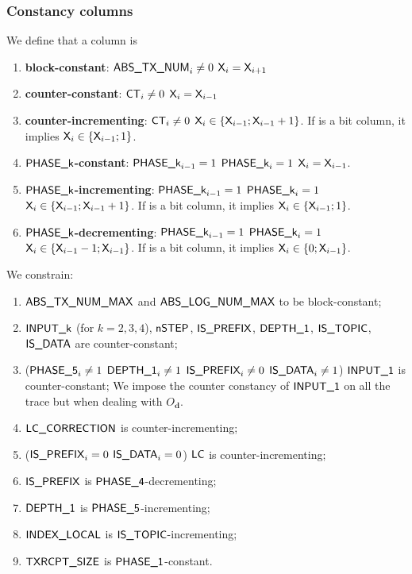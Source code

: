 \subsubsection{Constancy columns} \label{constancy_constraints}
We define that a column  is
\begin{enumerate}
    \item \textbf{block-constant}: \If $\textsf{ABS\_TX\_NUM}_{i} \ne 0$ \Then $\textsf{X}_{i}=\textsf{X}_{i+1}$
    \item \textbf{counter-constant}: \If $\textsf{CT}_{i} \ne 0$ \Then $\textsf{X}_{i}=\textsf{X}_{i-1}$
    \item \textbf{counter-incrementing}: \If $\textsf{CT}_{i} \ne 0$ \Then $\textsf{X}_{i} \in \{\textsf{X}_{i-1}; \textsf{X}_{i-1} +1 \}$. If  is a bit column, it implies $\textsf{X}_{i} \in \{\textsf{X}_{i-1}; 1 \}$.
    \item \textbf{$\bm{\textsf{PHASE\_k}}$-constant}: \If $\textsf{PHASE\_k}_{i-1} = 1$ \et $\textsf{PHASE\_k}_{i}=1$ \Then $\textsf{X}_{i}=\textsf{X}_{i-1}$.
    \item \textbf{$\textsf{PHASE\_k}$-incrementing}: \If $\textsf{PHASE\_k}_{i-1} = 1$ \et $\textsf{PHASE\_k}_{i}=1$ \Then $\textsf{X}_{i} \in \{\textsf{X}_{i-1}; \textsf{X}_{i-1} +1 \}$. If  is a bit column, it implies $\textsf{X}_{i} \in \{\textsf{X}_{i-1}; 1 \}$.
    \item \textbf{$\bm{\textsf{PHASE\_k}}$-decrementing}: \If $\textsf{PHASE\_k}_{i-1} = 1$ \et $\textsf{PHASE\_k}_{i}=1$ \Then $\textsf{X}_{i} \in \{\textsf{X}_{i-1} -1; \textsf{X}_{i-1} \}$. If  is a bit column, it implies $\textsf{X}_{i} \in \{0 ; \textsf{X}_{i-1}\}$.
\end{enumerate}

We constrain: 
\begin{enumerate}
    \item $\textsf{ABS\_TX\_NUM\_MAX}$ and $\textsf{ABS\_LOG\_NUM\_MAX}$ to be block-constant;
    \item $\textsf{INPUT\_k}$ (for $k= 2, 3, 4$), $\textsf{nSTEP}$, $\textsf{IS\_PREFIX}$, $\textsf{DEPTH\_1}$, $\textsf{IS\_TOPIC}$, $\textsf{IS\_DATA}$  are counter-constant;
    \item \If ($\textsf{PHASE\_5}_{i} \ne 1$ \Or $\textsf{DEPTH\_1}_{i} \ne 1$ \Or $\textsf{IS\_PREFIX}_{i} \ne 0$ \Or $\textsf{IS\_DATA}_{i} \ne 1$) \Then $\textsf{INPUT\_1}$ is counter-constant;
    \saNote{} We impose the counter constancy of $\textsf{INPUT\_1}$ on all the trace but when dealing with $O_{\textbf{d}}$.

    \item $\textsf{LC\_CORRECTION}$ is counter-incrementing;
    \item \If ($\textsf{IS\_PREFIX}_{i}=0$ \Or $\textsf{IS\_DATA}_{i}=0$) \Then $\textsf{LC}$ is counter-incrementing;
    \item $\textsf{IS\_PREFIX}$ is $\textsf{PHASE\_4}$-decrementing;
    \item $\textsf{DEPTH\_1}$ is $\textsf{PHASE\_5}$-incrementing;
    \item $\textsf{INDEX\_LOCAL}$ is $\textsf{IS\_TOPIC}$-incrementing;
    \item $\textsf{TXRCPT\_SIZE}$ is $\textsf{PHASE\_1}$-constant.
\end{enumerate}

